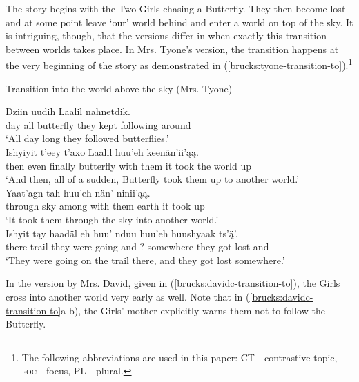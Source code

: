 The story begins with the Two Girls chasing a Butterfly. They then become lost and at some point leave `our' world behind and enter a world on top of the sky. It is intriguing, though, that the versions differ in when exactly this transition between worlds takes place. In Mrs. Tyone's version, the transition happens at the very beginning of the story as demonstrated in (\ref{brucks:tyone-transition-to}).\footnote{The following abbreviations are used in this paper: CT—contrastive topic, \textsc{foc}—focus, PL—plural.}

\begin{exe}
\ex Transition into the world above the sky (Mrs. Tyone) \label{brucks:tyone-transition-to}
\begin{xlist}

\ex \gll Dziin uudih Laalil nahnetdik.  \\
 day all butterfly {they kept following around} \\
\glt `All day long they followed butterflies.' \\

\ex \gll Ishyiyit t'eey t'axo Laalil huu'eh keenän'ii'ąą.  \\
 then even finally butterfly {with them} {it took the world up} \\
\glt `And then, all of a sudden, Butterfly took them up to another world.' \\

\ex \gll Yaat'agn tah huu'eh nän' ninii'ąą.  \\
 {through sky} among with them earth {it took up} \\
\glt `It took them through the sky into another world.'  \\

\ex \gll Ishyit tąy haadäl eh huu' nduu {huu'eh huushyaak} ts'ą̈'.  \\
 there trail {they were going} and ? somewhere {they got lost} and \\
\glt `They were going on the trail there, and they got lost somewhere.' \\
\end{xlist}
\end{exe}

In the version by Mrs. David, given in (\ref{brucks:davidc-transition-to}), the Girls cross into another world very early as well. Note that in (\ref{brucks:davidc-transition-to}a-b), the Girls' mother explicitly warns them not to follow the Butterfly.

